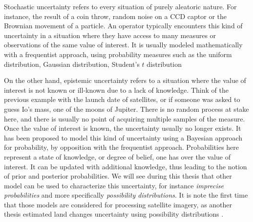Stochastic uncertainty refers to every situation of purely aleatoric nature. For instance, the result of a coin throw, random noise on a CCD captor or the Brownian movement of a particle. An operator typically encounters this kind of uncertainty in a situation where they have access to many measures or observations of the same value of interest. It is usually modeled mathematically with a frequentist approach, using probability measures such as the uniform distribution, Gaussian distribution, Student's $t$ distribution \etc {}

On the other hand, epistemic uncertainty refers to a situation where the value of interest is not known or ill-known due to a lack of knowledge. Think of the previous example with the launch date of satellites, or if someone was asked to guess Io's mass, one of the moons of Jupiter. There is no random process at stake here, and there is usually no point of acquiring multiple samples of the measure. Once the value of interest is known, the uncertainty usually no longer exists. It has been proposed to model this kind of uncertainty using a Bayesian approach for probability, by opposition with the frequentist approach. Probabilities here represent a state of knowledge, or degree of belief, one has over the value of interest. It can be updated with additional knowledge, thus leading to the notion of prior and posterior probabilities. We will see during this thesis that other model can be used to characterize this uncertainty, for instance \textit{imprecise probabilities} and more specifically \textit{possibility distributions}. It is note the first time that those models are considered for processing satellite imagery, as another thesis estimated land changes uncertainty using possibility distributions \cite{lesniewska-choquet_specialite_2020}.


